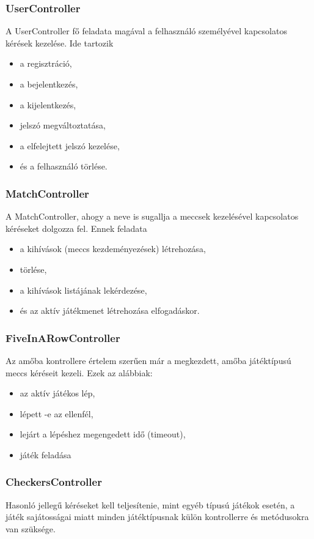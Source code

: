 \subsubsection{UserController}
A UserController fő feladata magával a felhasználó személyével kapcsolatos kérések kezelése. Ide tartozik
\begin{itemize}
	\item a regisztráció,
	\item a bejelentkezés,
	\item a kijelentkezés,
	\item jelszó megváltoztatása,
	\item a elfelejtett jelszó kezelése,
	\item és a felhasználó törlése.
\end{itemize}

\subsubsection{MatchController}
A MatchController, ahogy a neve is sugallja a meccsek kezelésével kapcsolatos kéréseket dolgozza fel. Ennek feladata
\begin{itemize}
	\item a kihívások (meccs kezdeményezések) létrehozása,
	\item törlése,
	\item a kihívások listájának lekérdezése,
	\item és az aktív játékmenet létrehozása elfogadáskor.
\end{itemize}

\subsubsection{FiveInARowController}
Az amőba kontrollere értelem szerűen már a megkezdett, amőba játéktípusú meccs kéréseit kezeli. Ezek az alábbiak:
\begin{itemize}
	\item az aktív játékos lép,
	\item lépett -e az ellenfél,
	\item lejárt a lépéshez megengedett idő (timeout),
	\item játék feladása
\end{itemize}

\subsubsection{CheckersController}
Hasonló jellegű kéréseket kell teljesítenie, mint egyéb típusú játékok esetén, a játék sajátosságai miatt minden játéktípusnak külön kontrollerre és metódusokra van szüksége.

